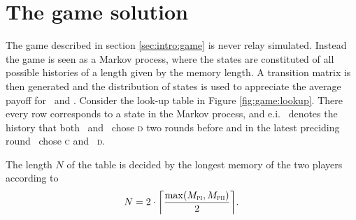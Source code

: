 \section{The game solution}\label{sec:game}
The game described in section \ref{sec:intro:game} is never relay simulated. Instead the game is seen as a Markov process, where the states are constituted of all possible histories of a length given by the memory length. A transition matrix is then generated and the distribution of states is used to appreciate the average payoff for \pone\ and \ptwo. Consider the look-up table in Figure \ref{fig:game:lookup}. There every row corresponds to a state in the Markov process, and e.i.\  denotes the history that both \pone\ and \ptwo\ chose \textsc{d} two rounds before and in the latest preciding round \pone\ chose \textsc{c} and \ptwo\ \textsc{d}.\mypar

The length $N$ of the table  is decided by the longest memory of the two players according to
\begin{equation*}
N = 2\cdot{\left\lceil{\frac{\max(M_{\textsc{pi}}, M_{\textsc{pii}})}{2}}\right\rceil}.
\end{equation*}


